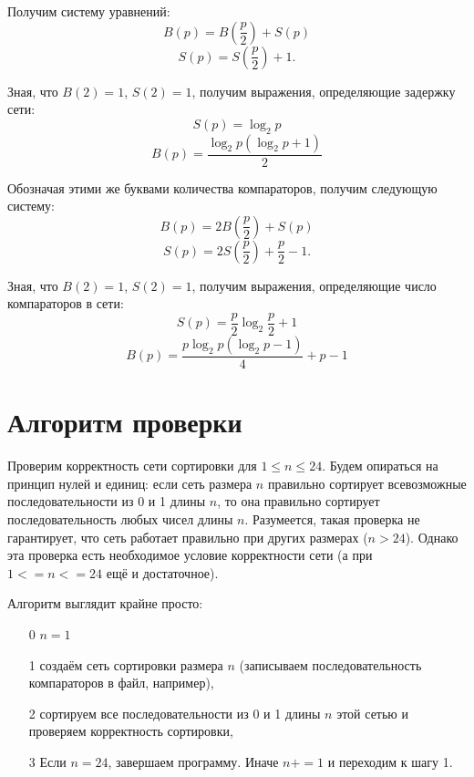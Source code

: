 \documentclass[14pt]{extarticle}
\begin{document}
Получим систему уравнений:
\begin{equation*}
B(p) = B \left( \frac{p}{2} \right) + S(p)
\end{equation*}
\begin{equation*}
S(p) = S \left( \frac{p}{2} \right) + 1.
\end{equation*}

Зная, что $B(2) = 1$, $S(2) = 1$, получим выражения, определяющие задержку сети:
\begin{equation*}
S(p) = \log_2 p
\end{equation*}
\begin{equation*}
B(p) = \frac{\log_2 p \left( \log_2 p + 1 \right)}{2}
\end{equation*}

Обозначая этими же буквами количества компараторов, получим следующую систему:
\begin{equation*}
B(p) = 2B \left( \frac{p}{2} \right) + S(p)
\end{equation*}
\begin{equation*}
S(p) = 2S \left( \frac{p}{2} \right) + \frac{p}{2} - 1.
\end{equation*}

Зная, что $B(2) = 1$, $S(2) = 1$, получим выражения, определяющие число компараторов в сети:
\begin{equation*}
S(p) = \frac{p}{2} \log_2 \frac{p}{2} + 1
\end{equation*}
\begin{equation*}
B(p) = \frac{p \log_2 p \left( \log_2 p - 1 \right)}{4} + p-1
\end{equation*}

\section{Алгоритм проверки}
Проверим корректность сети сортировки для $1 \leq n \leq 24$.
Будем опираться на принцип нулей и единиц: если сеть размера $n$ правильно сортирует всевозможные последовательности из 0 и 1 длины $n$, то она правильно сортирует последовательность любых чисел длины $n$. Разумеется, такая проверка не гарантирует, что сеть работает правильно при других размерах ($n>24$). Однако эта проверка есть необходимое условие корректности сети (а при $1<=n<=24$ ещё и достаточное).

Алгоритм выглядит крайне просто:
\begin{itemize}
\item[0] $n=1$
\item[1] создаём сеть сортировки размера $n$ (записываем последовательность компараторов в файл, например),
\item[2] сортируем все последовательности из 0 и 1 длины $n$ этой сетью и проверяем корректность сортировки,
\item[3] Если $n=24$, завершаем программу. Иначе $n += 1$ и переходим к шагу 1.
\end{itemize}
\end{document}

